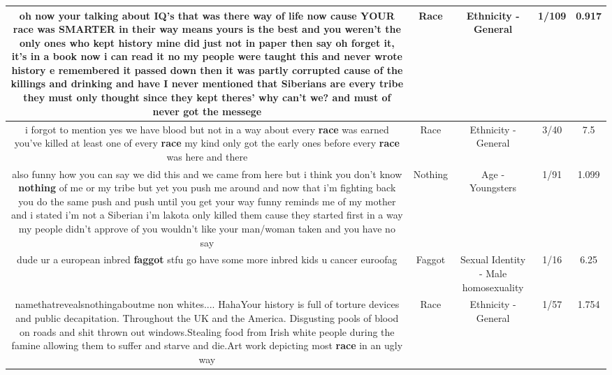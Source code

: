 \documentclass[11pt]{article}
\newlength\mylength
\begin{document}
\begin{center}
\begin{longtable}{|C{.65\mylength}|C{.30\mylength}|C{.12\mylength}|C{.12\mylength}|C{.12\mylength}|}
  \small oh now your talking about IQ's that was there way of life now cause YOUR \textbf{race} was SMARTER in their way means yours is the best and you weren't the only ones who kept history mine did just not in paper then say oh forget it, it's in a book now i can read it no my people were taught this and never wrote history e remembered it passed down then it was partly corrupted cause of the killings and drinking and have I never mentioned that Siberians are every tribe they must only thought since they kept theres' why can't we? and must of never got the messege\normalsize   & Race & Ethnicity - General & 1/109 & 0.917 \\  \hline
  \small i forgot to mention yes we have blood but not in a way about every \textbf{race} was earned you've killed at least one of every \textbf{race} my kind only got the early ones before every \textbf{race} was here and there\normalsize   & Race & Ethnicity - General & 3/40 & 7.5 \\  \hline
  \small also funny how you can say we did this and we came from here but i think you don't know \textbf{nothing} of me or my tribe but yet you push me around and now that i'm fighting back you do the same push and push until you get your way funny reminds me of my mother and i stated i'm not a Siberian i'm lakota only killed them cause they started first in a way my people didn't approve of you wouldn't like your man/woman taken and you have no say\normalsize   & Nothing & Age - Youngsters & 1/91 & 1.099 \\  \hline
  \small dude ur a european inbred \textbf{faggot} stfu go have some more inbred kids u cancer euroofag\normalsize   & Faggot & Sexual Identity - Male homosexuality & 1/16 & 6.25 \\  \hline
  \small namethatrevealsnothingaboutme non whites.... HahaYour history is full of torture devices and public decapitation. Throughout the UK and the America. Disgusting pools of blood on roads and shit thrown out windows.Stealing food from Irish white people during the famine allowing them to suffer and starve and die.Art work depicting most \textbf{race} in an ugly way\normalsize   & Race & Ethnicity - General & 1/57 & 1.754 \\  \hline

\end{longtable}
\end{center}
\end{document}
